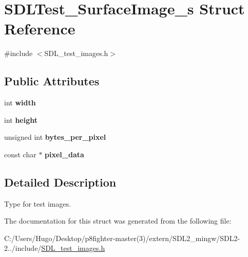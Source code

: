 \hypertarget{struct_s_d_l_test___surface_image__s}{}\section{S\+D\+L\+Test\+\_\+\+Surface\+Image\+\_\+s Struct Reference}
\label{struct_s_d_l_test___surface_image__s}


{\ttfamily \#include $<$S\+D\+L\+\_\+test\+\_\+images.\+h$>$}

\subsection*{Public Attributes}
\begin{DoxyCompactItemize}
\item 
\mbox{\label{struct_s_d_l_test___surface_image__s_a3cbacf6b015a22832ab4d3f509719609}} 
int {\bfseries width}
\item 
\mbox{\label{struct_s_d_l_test___surface_image__s_a310092874695556e4b7f1f63aec24213}} 
int {\bfseries height}
\item 
\mbox{\label{struct_s_d_l_test___surface_image__s_a2daf91bab3d79fb9dfa25e8ade43e606}} 
unsigned int {\bfseries bytes\+\_\+per\+\_\+pixel}
\item 
\mbox{\label{struct_s_d_l_test___surface_image__s_acf2d3006bea5690f564d3003d1512fa7}} 
const char $\ast$ {\bfseries pixel\+\_\+data}
\end{DoxyCompactItemize}


\subsection{Detailed Description}
Type for test images. 

The documentation for this struct was generated from the following file\+:\begin{DoxyCompactItemize}
\item 
C\+:/\+Users/\+Hugo/\+Desktop/p8fighter-\/master(3)/extern/\+S\+D\+L2\+\_\+mingw/\+S\+D\+L2-\/2../include/\hyperlink{_s_d_l__test__images_8h}{S\+D\+L\+\_\+test\+\_\+images.\+h}\end{DoxyCompactItemize}
